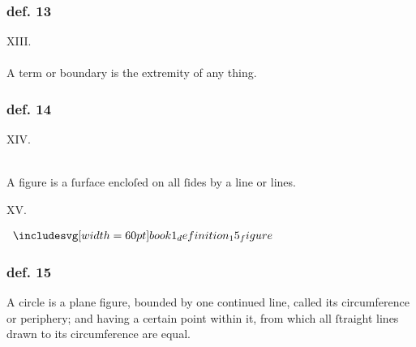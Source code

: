 \hfill

\begin{minipage}{0.1\textwidth}
    \phantom{}
\end{minipage}%
\begin{minipage}{0.8\textwidth}
    \subsubsection{def. 13}
    \begin{center}
        XIII.\label{book1def13}\\
        \hfill\\
        A term or boundary is the extremity of any thing.
    \end{center}
    \subsubsection{def. 14}
    \begin{center}
        XIV.\label{book1def14}\\
        \hfill\\
        \raggedright A figure is a ſurface encloſed on all ſides by a line or lines.
    \end{center}
\end{minipage}%
\begin{minipage}{0.1\textwidth}
    \phantom{}
\end{minipage}%

\hfill

\begin{center}
    XV.\label{book1def15}\\
\end{center}
\begin{minipage}{0.33\textwidth}
    \begin{center}
        $\img[0][0][60]{book1_definition_15_figure}$
    \end{center}
\end{minipage}%
\begin{minipage}{0.67\textwidth}
    \subsubsection{def. 15}
    \begin{center}
        \raggedright A circle is a plane figure, bounded by one continued line, called its circumference or periphery; and having a certain point within it, from which all ſtraight lines drawn to its circumference are equal.
    \end{center}
\end{minipage}

